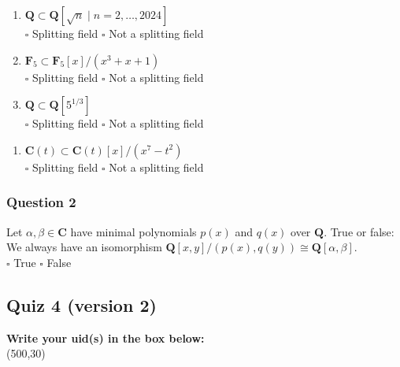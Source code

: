 \documentclass[11pt]{article}
\begin{document}
\begin{enumerate}
\item \(\mathbf{Q} \subset \mathbf{Q}[\sqrt n \mid n = 2, \dots, 2024]\)\\

\(\square\) Splitting field \qquad \(\square\)   Not a splitting field \\

\item \(\mathbf{F}_5 \subset \mathbf{F}_5[x]/(x^3+x+1)\)\\

\(\square\) Splitting field \qquad \(\square\)   Not a splitting field \\

\item \(\mathbf{Q} \subset \mathbf{Q}[5^{1/3}]\)\\

\(\square\) Splitting field \qquad \(\square\)   Not a splitting field \\
\end{enumerate}


\begin{enumerate}
\item \(\mathbf{C}(t) \subset \mathbf{C}(t)[x]/(x^7-t^2)\)\\

\(\square\) Splitting field \qquad \(\square\)   Not a splitting field \\
\end{enumerate}
\subsubsection{Question 2}
\label{sec:orgac71696}

Let \(\alpha, \beta \in \mathbf{C}\) have minimal polynomials \(p(x)\) and \(q(x)\) over \(\mathbf{Q}\).
True or false: We always have an isomorphism \(\mathbf{Q}[x,y]/(p(x), q(y)) \cong \mathbf{Q}[\alpha,\beta]\).\\

\(\square\) True \qquad \(\square\)   False \\
\subsection{Quiz 4 (version 2)}
\label{sec:org51c79e3}
\vspace{1cm}

\noindent
\textbf{Write your uid(s) in the box below:}\\
\framebox(500,30)
\end{document}
